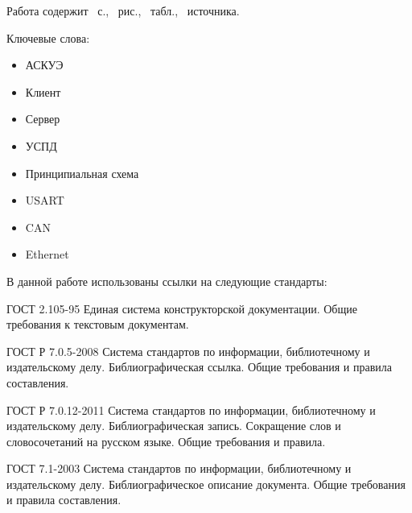 \documentclass[utf8,14pt, coursreport]{G7-32}
\begin{document}

\frontmatter %



\Referat %

Работа содержит \totalpages{}~с., \totalfigures{}~рис., \totaltables{}~табл., \totalbibs{}~источника.

Ключевые слова:
\begin{itemize}
\item АСКУЭ
\item Клиент
\item Сервер
\item УСПД
\item Принципиальная схема
\item USART
\item CAN
\item Ethernet
\end{itemize}

\tableofcontents

\iffalse
\NormRefs

В данной работе использованы ссылки на следующие стандарты:

ГОСТ 2.105-95 Единая система конструкторской документации. Общие требования к текстовым документам.

ГОСТ Р 7.0.5-2008 Система стандартов по информации, библиотечному и издательскому делу. Библиографическая ссылка. Общие требования и правила составления.

ГОСТ Р 7.0.12-2011 Система стандартов по информации, библиотечному и издательскому делу. Библиографическая запись. Сокращение слов и словосочетаний на русском языке. Общие требования и правила.

ГОСТ 7.1-2003 Система стандартов по информации, библиотечному и издательскому делу. Библиографическое описание документа. Общие требования и правила составления.
\end{document}
